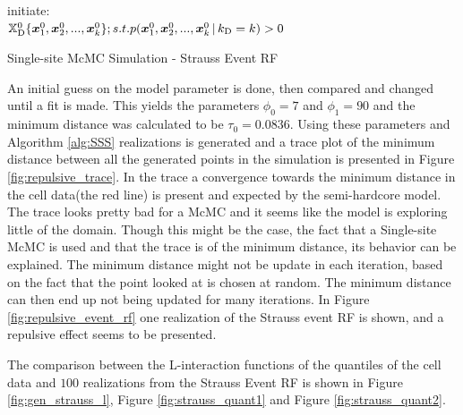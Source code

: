 \begin{algorithm}[H]
\SetAlgoLined
initiate:\\
$\mathbb{X}_\textrm{D}^0\{\bm{x}_1^0,\bm{x}_2^0,...,\bm{x}_k^0\}; s.t. p(\bm{x}_1^0,\bm{x}_2^0,...,\bm{x}_k^0\, | \, k_\textrm{D} = k)>0$\\
\caption{Single-site McMC Simulation - Strauss Event RF}
 \label{alg:SSS}
\end{algorithm} 

An initial guess on the model parameter is done, then compared and changed until a fit is made. This yields the parameters  $\phi_0 = 7$ and $\phi_1 = 90$ and the minimum distance was calculated to be $\tau_0 = 0.0836$. Using these parameters and Algorithm \ref{alg:SSS} realizations is generated and a trace plot of the minimum distance between all the generated points in the simulation is presented in Figure \ref{fig:repulsive_trace}. In the trace a convergence towards the minimum distance in the cell data(the red line) is present and expected by the semi-hardcore model. The trace looks pretty bad for a McMC and it seems like the model is exploring little of the domain. Though this might be the case, the fact that a Single-site McMC is used and that the trace is of the minimum distance, its behavior can be explained. The minimum distance might not be update in each iteration, based on the fact that the point looked at is chosen at random. The minimum distance can then end up not being updated for many iterations. In Figure \ref{fig:repulsive_event_rf} one realization of the Strauss event RF is shown, and a repulsive effect seems to be presented.  

The comparison between the L-interaction functions of the quantiles of the cell data and $100$ realizations from the Strauss Event RF is shown in Figure \ref{fig:gen_strauss_l}, Figure \ref{fig:strauss_quant1} and  Figure \ref{fig:strauss_quant2}. 



